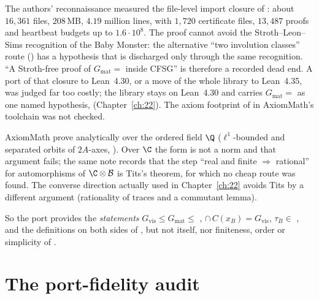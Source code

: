 \begin{warning}[title={Dead end: porting \texttt{gmat\_eq\_griess} to Lean 4.30}]
The authors' reconnaissance measured the file-level import closure
of : about $16{,}361$ files, $208$\,MB, $4.19$ million lines, with $1{,}720$
certificate files, $13{,}487$  proofs and heartbeat budgets up to $1.6\cdot10^8$.
The proof cannot avoid the Stroth--Leon--Sims recognition of the Baby Monster: the alternative
``two involution classes'' route () has a hypothesis that is discharged only
through the same recognition.  ``A Stroth-free proof of $G_{\mathrm{mat}}=$  inside CFSG'' is
therefore a recorded dead end.  A port of that closure to Lean~4.30, or a move of the whole library to Lean~4.35, was judged far too
costly; the library stays on Lean~4.30 and carries $G_{\mathrm{mat}}=$  as one named hypothesis,
 (Chapter~\ref{ch:22}).  The axiom footprint of  in AxiomMath's
toolchain was not checked.
\end{warning}

\begin{warning}[title={Recorded diagnosis: AxiomMath's finiteness proof does not transfer to $\mathbb C$}]
AxiomMath prove  analytically over the ordered field $\Q$ ($\ell^1$-bounded and
separated orbits of $2A$-axes, ).  Over $\C$ the form is not a norm
and that argument fails; the same note records that the step ``real and finite
$\Rightarrow$ rational'' for automorphisms of $\C\otimes\chXXIB$ is Tits's theorem, for which no cheap
route was found.  The converse direction actually used in Chapter~\ref{ch:22} avoids Tits by a
different argument (rationality of traces and a commutant lemma).
\end{warning}

So the port provides the \emph{statements} $G_{\mathrm{vis}}\le G_{\mathrm{mat}}\le$ ,
 $\cap\,C(x_B)=G_{\mathrm{vis}}$, $\tau_B\in$ , and the definitions on both sides
of , but not  itself, nor finiteness, order or simplicity of
.


\section{The port-fidelity audit}\label{ch21:sec:fidelityaudit}

